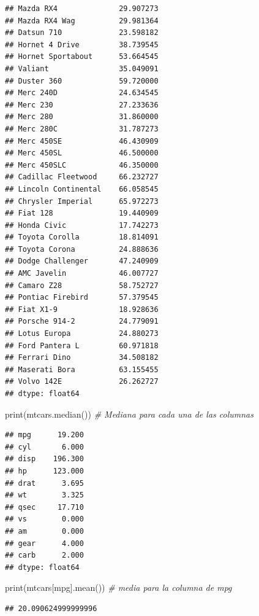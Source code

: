\documentclass[
]{article}
\newenvironment{Shaded}{\begin{snugshade}}{\end{snugshade}}
\newcommand{\BuiltInTok}[1]{#1}
\newcommand{\CommentTok}[1]{\textcolor[rgb]{0.56,0.35,0.01}{\textit{#1}}}
\newcommand{\NormalTok}[1]{#1}
\newcommand{\StringTok}[1]{\textcolor[rgb]{0.31,0.60,0.02}{#1}}
\begin{document}
\begin{verbatim}
## Mazda RX4              29.907273
## Mazda RX4 Wag          29.981364
## Datsun 710             23.598182
## Hornet 4 Drive         38.739545
## Hornet Sportabout      53.664545
## Valiant                35.049091
## Duster 360             59.720000
## Merc 240D              24.634545
## Merc 230               27.233636
## Merc 280               31.860000
## Merc 280C              31.787273
## Merc 450SE             46.430909
## Merc 450SL             46.500000
## Merc 450SLC            46.350000
## Cadillac Fleetwood     66.232727
## Lincoln Continental    66.058545
## Chrysler Imperial      65.972273
## Fiat 128               19.440909
## Honda Civic            17.742273
## Toyota Corolla         18.814091
## Toyota Corona          24.888636
## Dodge Challenger       47.240909
## AMC Javelin            46.007727
## Camaro Z28             58.752727
## Pontiac Firebird       57.379545
## Fiat X1-9              18.928636
## Porsche 914-2          24.779091
## Lotus Europa           24.880273
## Ford Pantera L         60.971818
## Ferrari Dino           34.508182
## Maserati Bora          63.155455
## Volvo 142E             26.262727
## dtype: float64
\end{verbatim}

\begin{Shaded}
\begin{Highlighting}[]
\BuiltInTok{print}\NormalTok{(mtcars.median()) }\CommentTok{\# Mediana para cada una de las columnas}
\end{Highlighting}
\end{Shaded}

\begin{verbatim}
## mpg      19.200
## cyl       6.000
## disp    196.300
## hp      123.000
## drat      3.695
## wt        3.325
## qsec     17.710
## vs        0.000
## am        0.000
## gear      4.000
## carb      2.000
## dtype: float64
\end{verbatim}

\begin{Shaded}
\begin{Highlighting}[]
\BuiltInTok{print}\NormalTok{(mtcars[}\StringTok{\textquotesingle{}mpg\textquotesingle{}}\NormalTok{].mean()) }\CommentTok{\# media para la columna de \textquotesingle{}mpg\textquotesingle{}}
\end{Highlighting}
\end{Shaded}

\begin{verbatim}
## 20.090624999999996
\end{verbatim}
\end{document}
